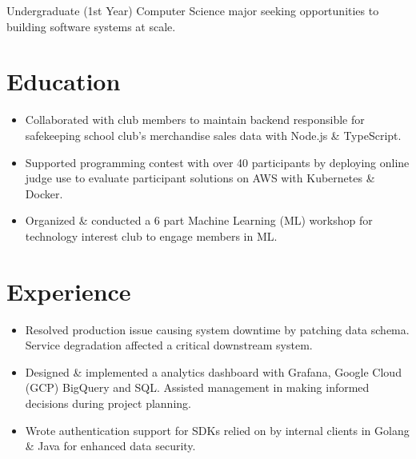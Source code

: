 %
%


\fancyhead{} %


Undergraduate (1st Year) Computer Science major seeking opportunities to building software systems at scale.

\section{Education}
\begin{itemize}
  \item Collaborated with club members to maintain backend responsible for safekeeping school club's merchandise sales data with Node.js \& TypeScript.
\end{itemize}
\begin{itemize}
  \item Supported programming contest with over 40 participants by deploying online judge use to evaluate participant solutions on AWS with Kubernetes \& Docker.
  \item Organized \& conducted a 6 part Machine Learning  (ML) workshop for technology interest club to engage members in ML.
\end{itemize}


\section{Experience}
\begin{itemize}
    \item Resolved production issue causing system downtime by patching data schema. Service degradation affected a critical downstream system.
    \item 
        Designed \& implemented a analytics dashboard with Grafana, Google Cloud (GCP) BigQuery and SQL. Assisted management in making informed decisions during project planning.
    \item Wrote authentication support for SDKs relied on by internal clients in Golang \& Java for enhanced data security.
\end{itemize}

